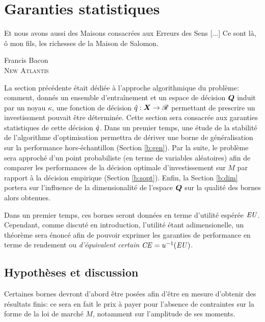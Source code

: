 \section{Garanties statistiques}
\label{sec:bound}

\epigraph{Et nous avons aussi des Maisons consacrées aux Erreurs des Sens [...] Ce sont là, ô
  mon fils, les richesses de la Maison de Salomon.}{Francis Bacon\\\textsc{New Atlantis}}



La section précédente était dédiée à l'approche algorithmique du problème: comment, donnés
un ensemble d'entraînement et un espace de décision $\bm Q$ induit par un noyau $\kappa$, une
fonction de décision $\hat q:\bm{X} \to \mathscr{R}$ permettant de prescrire un investissment pouvait être
déterminée. Cette section sera consacrée aux garanties statistiques de cette
décision $\hat q$. Dans un premier temps, une étude de la stabilité de l'algorithme d'optimisation
permettra de dériver une borne de généralisation sur la performance hors-échantillon
(Section \ref{b:gen}). Par la suite, le problème sera approché d'un point probabiliste (en
terme de variables aléatoires) afin de comparer les performances de la décision optimale
d'investissement sur $M$ par rapport à la décision empirique (Section
\ref{b:sopt}). Enfin, la Section \ref{b:dim} portera sur l'influence de la dimensionalité
de l'espace $\bm Q$ sur la qualité des bornes alors obtenues. 

Dans un premier temps, ces bornes seront données en terme d'utilité espérée
$\operatorname{\mbox{\textit{EU}}}$. Cependant, comme discuté en introduction, l'utilité étant adimensionelle, un
théorème sera énoncé afin de pouvoir exprimer les garanties de performance en terme de
rendement ou \textit{d'équivalent certain} $\operatorname{\mbox{\textit{CE}}} = u^{-1}(\operatorname{\mbox{\textit{EU}}})$. 


\subsection{Hypothèses et discussion}

Certaines bornes devront d'abord être posées afin d'être en mesure d'obtenir des résultats
finis: ce sera en fait le prix à payer pour l'absence de contraintes sur la forme de la
loi de marché $M$, notamment sur l'amplitude de ses moments. 

